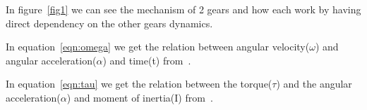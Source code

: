 \documentclass[a4paper, 12pt]{article}
\begin{document}
In figure~\ref{fig1} we can see the mechanism of 2 gears and how each work 
by having direct dependency on the other gears dynamics.

In equation~\ref{eqn:omega} we get the relation between
angular velocity($ \omega $) and angular acceleration($ \alpha $) and time(t)
from~\cite{wu}.

In equation~\ref{eqn:tau} we get the relation between the torque($ \tau $)
and the angular acceleration($ \alpha $) 
and moment of inertia(I) from~\cite{lazarian}.
 


\end{document}
